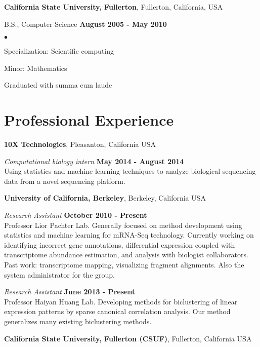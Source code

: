 \documentclass[margin,line]{res}
\newenvironment{list2}{
  \begin{list}{$\bullet$}{%
      \setlength{\itemsep}{0in}
      \setlength{\parsep}{0in} \setlength{\parskip}{0in}
      \setlength{\topsep}{0in} \setlength{\partopsep}{0in}
      \setlength{\leftmargin}{0.2in}}}{\end{list}}
\begin{document}
\begin{resume}
{\bf California State University, Fullerton}, Fullerton, California, USA

\vspace{-.3cm}
B.S., Computer Science \hfill {\bf August 2005 - May 2010}\\
\vspace{-.45cm}
\begin{list2}
\vspace*{1mm}
\item Specialization: Scientific computing
\item Minor: Mathematics
\item Graduated with summa cum laude
\end{list2}

\section{\sc Professional Experience}

{\bf 10X Technologies}, Pleasanton, California USA
\vspace{-.3cm}

{\em Computational biology intern} \hfill {\bf May 2014 - August 2014}\\
Using statistics and machine learning techniques to analyze biological
sequencing data from a novel sequencing platform.

{\bf University of California, Berkeley}, Berkeley, California USA
\vspace{-.3cm}

{\em Research Assistant} \hfill {\bf October 2010 - Present}\\
Professor Lior Pachter Lab. Generally focused on method development using
statistics and machine learning for mRNA-Seq technology. Currently working on
identifying incorrect gene annotations, differential expression coupled with
transcriptome abundance estimation, and analysis with biologist collaborators.
Past work: transcriptome mapping, visualizing fragment alignments. Also the
system administrator for the group.

{\em Research Assistant} \hfill {\bf June 2013 - Present}\\
Professor Haiyan Huang Lab. Developing methods for biclustering of linear
expression patterns by sparse canonical correlation analysis. Our method
generalizes many existing biclustering methods.

{\bf California State University, Fullerton (CSUF)}, Fullerton, California USA
\vspace{-.3cm}


\end{resume}
\end{document}
